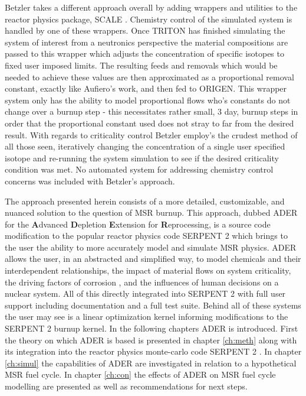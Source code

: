 Betzler takes a different approach overall by adding wrappers and utilities
to the reactor physics package, SCALE \cite{Betzler}. 
Chemistry control of the simulated
system is handled by one of these wrappers. Once TRITON has finished simulating
the system of interest from a neutronics perspective the material compositions
are passed to this wrapper which adjusts the concentration of specific isotopes
to fixed user imposed limits. The resulting feeds and removals which would be
needed to achieve these values are then approximated as a proportional removal
constant, exactly like Aufiero's work, and then fed to ORIGEN. This wrapper
system only has the ability to model proportional flows who's constants do not
change over a burnup step - this necessitates rather small, 3 day, burnup steps
in order that the proportional constant used does not stray to far from the
desired result. With regards to criticality control Betzler employ's the crudest
method of all those seen, iteratively changing the concentration of a single
user specified isotope and re-running the system simulation to see if the
desired criticality condition was met. No automated system for addressing
chemistry control concerns was included with Betzler's approach. 

The approach presented herein consists of a more detailed, customizable, and
nuanced solution to the question of MSR burnup. This approach, dubbed ADER for
the \textbf{A}dvanced \textbf{D}epletion \textbf{E}xtension for 
\textbf{R}eprocessing, is a source code modification to the popular reactor
physics code SERPENT 2 which brings to the user the ability to more accurately
model and simulate MSR physics. ADER allows the user, in an abstracted and
simplified way, to model chemicals and their interdependent relationships, the
impact of material flows on system criticality, the driving factors of corrosion
, and the influences of human decisions on a nuclear system. All of this
directly integrated into SERPENT 2 with full user support including
documentation and a full test suite. Behind all of these systems the user may
see is a linear optimization kernel informing modifications to the SERPENT 2
burnup kernel.  In the following chapters ADER is introduced. First the theory 
on which ADER is based is
presented in chapter \ref{ch:meth} along with its integration into the reactor
physics monte-carlo code SERPENT 2 \cite{Jaakko}. In chapter
\ref{ch:simul} the capabilities of ADER are investigated in relation to a
hypothetical MSR fuel cycle. In chapter \ref{ch:con} the effects of ADER on
MSR fuel cycle modelling are presented as well as recommendations for next
steps. 
